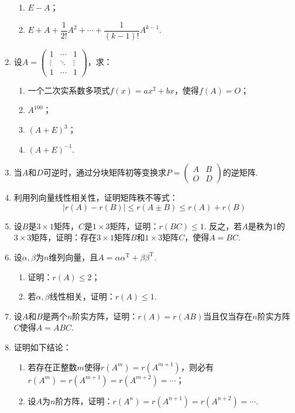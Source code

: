\begin{enumerate}
\begin{enumerate}
              \item $E-A$；

              \item $E+A+\dfrac{1}{2!}A^2+\cdots+\dfrac{1}{(k-1)!}A^{k-1}$.
          \end{enumerate}

    \item 设$A=\begin{pmatrix}
                  1      & \cdots & 1      \\
                  \vdots & \ddots & \vdots \\
                  1      & \cdots & 1
              \end{pmatrix}$，求：
          \begin{enumerate}
              \item 一个二次实系数多项式$f(x)=ax^2+bx$，使得$f(A)=O$；
              \item $A^100$；
              \item $(A+E)^3$；
              \item $(A+E)^{-1}$.
          \end{enumerate}

    \item 当$A$和$D$可逆时，通过分块矩阵初等变换求$P=\begin{pmatrix}A & B \\ O & D\end{pmatrix}$的逆矩阵.

    \item 利用列向量线性相关性，证明矩阵秩不等式：\[|r(A)-r(B)|\leqslant r(A\pm B) \leqslant r(A)+r(B)\]

    \item 设$B$是$3 \times 1$矩阵，$C$是$1 \times 3$矩阵，证明：$r(BC) \leqslant 1$. 反之，若$A$是秩为1的$3 \times 3$矩阵，证明：存在$3 \times 1$矩阵$B$和$1 \times 3$矩阵$C$，使得$A = BC$.

    \item 设$\alpha,\beta$为$n$维列向量，且$A=\alpha\alpha^\mathrm{T}+\beta\beta^\mathrm{T}$.
        \begin{enumerate}
            \item 证明：$r(A) \leqslant 2$；

            \item 若$\alpha,\beta$线性相关，证明：$r(A) \leqslant 1$.
        \end{enumerate}

    \item 设$A$和$B$是两个$n$阶实方阵，证明：$r(A)=r(AB)$当且仅当存在$n$阶实方阵$C$使得$A=ABC$. %

    \item 证明如下结论：
    \begin{enumerate}
        \item 若存在正整数$m$使得$r(A^m)=r(A^{m+1})$，则必有$r(A^m)=r(A^{m+1})=r(A^{m+2})=\cdots$；
        \item 设$A$为$n$阶方阵，证明：$r(A^n)=r(A^{n+1})=r(A^{n+2})=\cdots$.
    \end{enumerate}
\end{enumerate}

